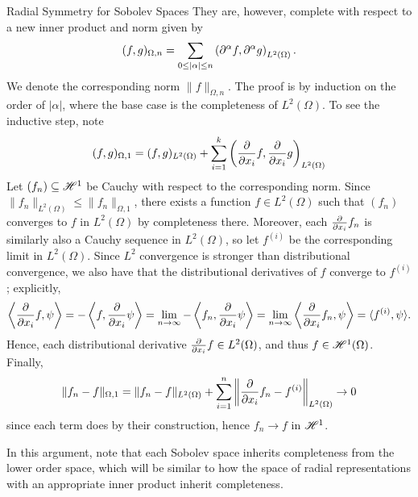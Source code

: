\begin{chapter}{Radial Symmetry for Sobolev Spaces}
They are, however, complete with respect to a new inner product and norm given by 
\begin{equation}
  (f,g)_{\Omega,n} = \sum_{0\le |\alpha| \le n} \left( \partial^\alpha f, \partial^\alpha g\right)_{L^2(\Omega)}.
\end{equation}
We denote the corresponding norm $\|f\|_{\Omega,n}$.
The proof is by induction on the order of $|\alpha|$, where the base case is the completeness of $L^2(\Omega)$.
To see the inductive step, note
\begin{equation}
  (f,g)_{\Omega,1} = (f,g)_{L^2(\Omega)} + \sum_{i=1}^k \left( \frac{\partial}{\partial x_i} f, \frac{\partial}{\partial x_i} g\right)_{L^2(\Omega)}
\end{equation}
 Let $(f_n) \subseteq \mathscr H^1$ be Cauchy with respect to the corresponding norm. 
Since $\| f_n \|_{L^2(\Omega)} \le \|f_n\|_{\Omega,1}$, there exists a function $f \in L^2(\Omega)$ such that $(f_n)$ converges to $f$ in $L^2(\Omega)$ by completeness there.
Moreover, each $\frac{\partial}{\partial x_i} f_n$ is similarly also a Cauchy sequence in $L^2(\Omega)$, so let $f^{(i)}$ be the corresponding limit in $L^2(\Omega)$.
Since $L^2$ convergence is stronger than distributional convergence, we also have that the distributional derivatives of $f$ converge to $f^{(i)}$; explicitly,
\begin{equation}
  \left\langle \frac{\partial}{\partial x_i} f, \psi \right\rangle = -\left\langle f, \frac{\partial}{\partial x_i}\psi \right\rangle = \lim_{n\to\infty}-\left\langle f_n, \frac{\partial}{\partial x_i}\psi \right\rangle = \lim_{n\to\infty}\left\langle \frac{\partial}{\partial x_i}f_n, \psi \right\rangle = \langle f^{(i)},\psi \rangle.
\end{equation}
Hence, each distributional derivative $\frac{\partial}{\partial x_i} f \in L^2(\Omega)$, and thus $f \in \mathscr H^1(\Omega)$.
Finally, 
\begin{equation}
  \|f_n - f\|_{\Omega,1} = \|f_n - f\|_{L^2(\Omega)} + \sum_{i=1}^n \left\|\frac{\partial}{\partial x_i} f_n - f^{(i)}\right\|_{L^2(\Omega)} \to 0
\end{equation}
since each term does by their construction, hence $f_n \to f$ in $\mathscr H^1$.

In this argument, note that each Sobolev space inherits completeness from the lower order space, which will be similar to how the space of radial representations with an appropriate inner product inherit completeness.


\end{chapter}
